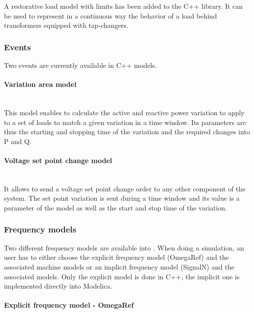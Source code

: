 \documentclass[a4paper, 12pt]{report}
\begin{document}
A restorative load model with limits has been added to the C++ library. It can be used to represent in a continuous way the behavior of a load behind transformers equipped with tap-changers.

\subsubsection{Events}
\label{Events}

Two events are currently available in C++ models.

\paragraph{Variation area model}
~~\\

This model enables to calculate the active and reactive power variation to apply to a set of loads to match a given variation in a time window. Its parameters are thus the starting and stopping time of the variation and the required changes into P and Q.

\paragraph{Voltage set point change model}
~~\\

It allows to send a voltage set point change order to any other component of the system. The set point variation is sent during a time window and its value is a parameter of the model as well as the start and stop time of the variation.

\subsubsection{Frequency models}
\label{Frequency}

Two different frequency models are available into \Dynawo. When doing a simulation, an user has to either choose the explicit frequency model (OmegaRef) and the associated machine models or an implicit frequency model (SignalN) and the associated models. Only the explicit model is done in C++, the implicit one is implemented directly into Modelica.

\paragraph{Explicit frequency model - OmegaRef}
~~\\
\end{document}
